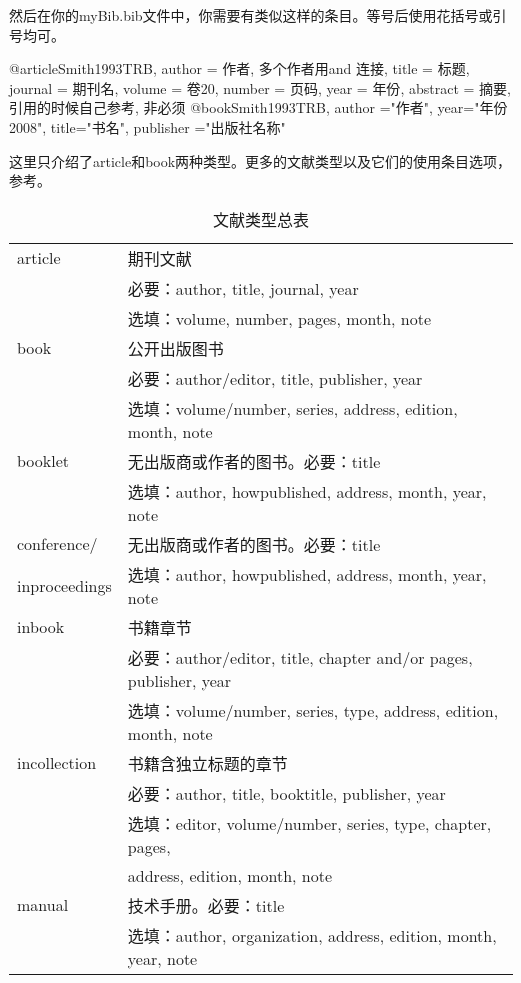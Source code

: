 然后在你的myBib.bib文件中，你需要有类似这样的条目。等号后使用花括号或引号均可。
\begin{latex}{}
@article{Smith1993TRB,
author = {作者, 多个作者用and 连接},
title = {标题},
journal = {期刊名},
volume = {卷20},
number = {页码},
year = {年份},
abstract = {摘要, 引用的时候自己参考, 非必须}}
@book{Smith1993TRB,
author ="作者",
year="年份2008",
title="书名",
publisher ="出版社名称"}
\end{latex}

这里只介绍了article和book两种类型。更多的文献类型以及它们的使用条目选项，参考。

\begin{table}[!htb]
\centering
\caption{\bibtex 文献类型总表}
\label{tab:bibtype}
\begin{tabular}{>{\ttfamily}ll}
\hline
article & 期刊文献 \\
& 必要：author, title, journal, year \\
& 选填：volume, number, pages, month, note \\
\hline
book & 公开出版图书 \\
& 必要：author/editor, title, publisher, year \\
& 选填：volume/number, series, address, edition, month, note \\
\hline
booklet & 无出版商或作者的图书。必要：title\\
& 选填：author, howpublished, address, month, year, note \\
\hline
conference/ & 无出版商或作者的图书。必要：title \\
inproceedings & 选填：author, howpublished, address, month, year, note \\
\hline
inbook & 书籍章节 \\
& 必要：author/editor, title, chapter and/or pages, publisher, year\\
& 选填：volume/number, series, type, address, edition, month, note\\
\hline
incollection & 书籍含独立标题的章节 \\
& 必要：author, title, booktitle, publisher, year \\
& 选填：editor, volume/number, series, type, chapter, pages, \\
& address, edition, month, note \\
\hline
manual & 技术手册。必要：title \\
& 选填：author, organization, address, edition, month, year, note \\

\end{tabular}
\end{table}
